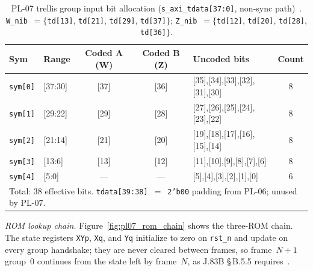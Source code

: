 \begin{table}[htbp]
  \caption{PL-07 trellis group input bit allocation
           (\texttt{s\_axi\_tdata[37:0]}, non-sync path)~\cite{ITU_J83}.
           \texttt{W\_nib}~$= \{$\texttt{td[13]}, \texttt{td[21]},
           \texttt{td[29]}, \texttt{td[37]}$\}$;
           \texttt{Z\_nib}~$= \{$\texttt{td[12]}, \texttt{td[20]},
           \texttt{td[28]}, \texttt{td[36]}$\}$.}
  \label{tab:pl07_input_map}
  \centering
  \small
  \begin{tabular}{lp{1.5cm}ccp{3.6cm}c}
    \hline
    Sym & Range & Coded A (W) & Coded B (Z) & Uncoded bits & Count \\
    \hline
    \texttt{sym[0]} & {[37:30]} & {[37]} & {[36]}
      & {[35]},{[34]},{[33]},{[32]},{[31]},{[30]} & 8 \\[2pt]
    \texttt{sym[1]} & {[29:22]} & {[29]} & {[28]}
      & {[27]},{[26]},{[25]},{[24]},{[23]},{[22]} & 8 \\[2pt]
    \texttt{sym[2]} & {[21:14]} & {[21]} & {[20]}
      & {[19]},{[18]},{[17]},{[16]},{[15]},{[14]} & 8 \\[2pt]
    \texttt{sym[3]} & {[13:6]}  & {[13]} & {[12]}
      & {[11]},{[10]},{[9]},{[8]},{[7]},{[6]}     & 8 \\[2pt]
    \texttt{sym[4]} & {[5:0]}   & ---    & ---
      & {[5]},{[4]},{[3]},{[2]},{[1]},{[0]}       & 6 \\
    \hline
    \multicolumn{6}{l}{\small Total: 38 effective bits.
      \texttt{tdata[39:38]}~$=$~\texttt{2'b00} padding from PL-06;
      unused by PL-07.} \\
  \end{tabular}
\end{table}

\textit{ROM lookup chain.}
Figure~\ref{fig:pl07_rom_chain} shows the three-ROM chain.
The state registers \texttt{XYp}, \texttt{Xq}, and \texttt{Yq}
initialize to zero on \texttt{rst\_n} and update on every group
handshake; they are never cleared between frames, so frame~$N\!+\!1$
group~0 continues from the state left by frame~$N$, as
J.83B \S\,B.5.5 requires~\cite{ITU_J83}.

